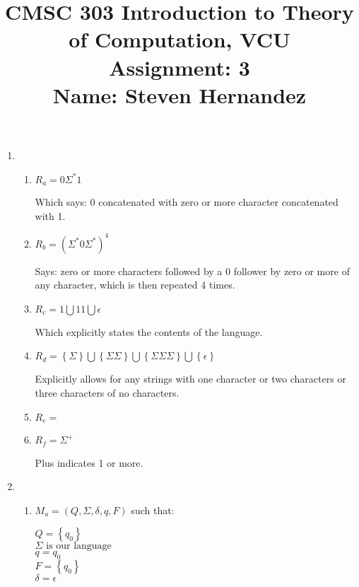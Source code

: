 \documentclass{article}
\newcommand{\set}[1]{{\left\{#1\right\}}}    %
\begin{document}
\title{
    CMSC 303 Introduction to Theory of Computation, VCU\\
    Assignment: 3\\
    Name: Steven Hernandez
}

\date{}

\maketitle
\vspace{-10mm}

\begin{enumerate}
    \item %
        \begin{enumerate}
            \item
                $R_a = 0\Sigma^*1$

                Which says: $0$ concatenated with zero or more character concatenated with 1.
            \item
                $R_b = (\Sigma^*0\Sigma^*)^4$

                Says: zero or more characters followed by a $0$ follower by zero or more of any character, which is then repeated 4 times.
            \item
                $R_c = 1 \bigcup 11 \bigcup \epsilon$

                Which explicitly states the contents of the language.
            \item
                $R_d = \set{\Sigma} \bigcup \set{\Sigma\Sigma} \bigcup \set{\Sigma\Sigma\Sigma} \bigcup \set{\epsilon}$

                Explicitly allows for any strings with one character or two characters or three characters of no characters.
            \item
                $R_e = $ %
            \item
                $R_f = \Sigma^+$

                Plus indicates 1 or more.
        \end{enumerate}
    \item %
        \begin{enumerate}
            \item
                $M_a = (Q, \Sigma, \delta, q, F)$ such that:

                $Q = \set{q_0}$ \\
                $\Sigma \text{ is our language }$ \\
                $q = q_0$ \\
                $F = \set{q_0}$ \\
                $\delta = \epsilon$


\end{enumerate}
\end{enumerate}
\end{document}

